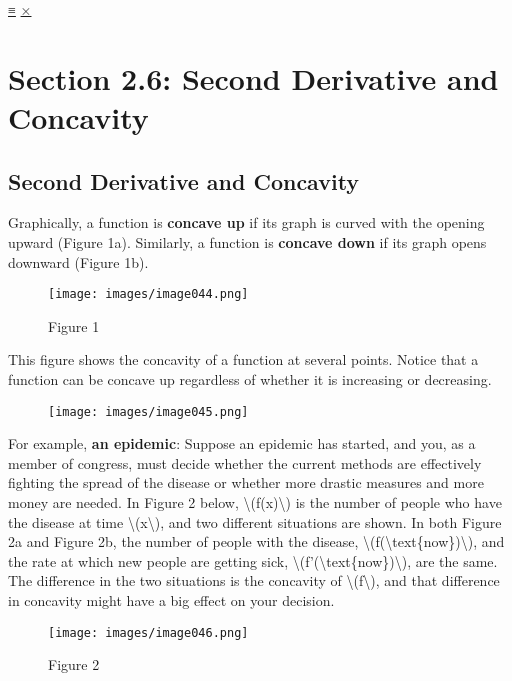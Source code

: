 \protect\hyperlink{main-nav}{≡} \protect\hyperlink{close-nav}{×}

\hypertarget{section-2.6-second-derivative-and-concavity}{%
\section{Section 2.6: Second Derivative and
Concavity}\label{section-2.6-second-derivative-and-concavity}}

\hypertarget{second-derivative-and-concavity}{%
\subsection{Second Derivative and
Concavity}\label{second-derivative-and-concavity}}

Graphically, a function is \textbf{concave up} if its graph is curved
with the opening upward (Figure 1a). Similarly, a function is
\textbf{concave down} if its graph opens downward (Figure 1b).

\begin{figure}
\centering
\texttt{[image: images/image044.png]}
\caption{Figure 1}
\end{figure}

This figure shows the concavity of a function at several points. Notice
that a function can be concave up regardless of whether it is increasing
or decreasing.

\begin{figure}
\centering
\texttt{[image: images/image045.png]}
\caption{}
\end{figure}

For example, \textbf{an epidemic}: Suppose an epidemic has started, and
you, as a member of congress, must decide whether the current methods
are effectively fighting the spread of the disease or whether more
drastic measures and more money are needed. In Figure 2 below,
\textbackslash{}(f(x)\textbackslash{}) is the number of people who have
the disease at time \textbackslash{}(x\textbackslash{}), and two
different situations are shown. In both Figure 2a and Figure 2b, the
number of people with the disease,
\textbackslash{}(f(\textbackslash{}text\{now\})\textbackslash{}), and
the rate at which new people are getting sick,
\textbackslash{}(f'(\textbackslash{}text\{now\})\textbackslash{}), are
the same. The difference in the two situations is the concavity of
\textbackslash{}(f\textbackslash{}), and that difference in concavity
might have a big effect on your decision.

\begin{figure}
\centering
\texttt{[image: images/image046.png]}
\caption{Figure 2}
\end{figure}

